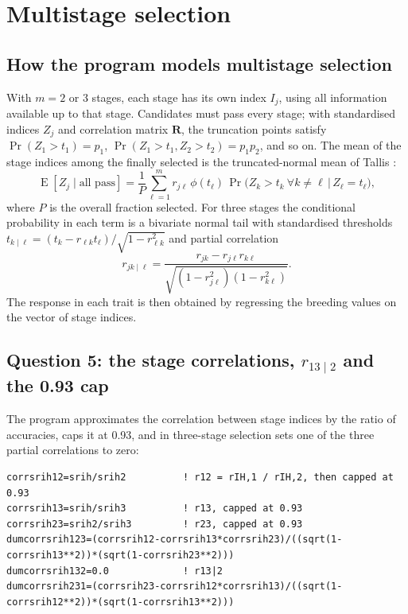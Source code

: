 \documentclass[11pt]{article}
\newcommand{\ma}[1]{\mathbf{#1}}
\newcommand{\E}{\operatorname{E}}
\begin{document}
\section{Multistage selection}\label{sec:multistage}

\subsection{How the program models multistage selection}
With $m=2$ or 3 stages, each stage has its own index $I_j$, using all information available up to that stage. Candidates must pass every stage; with standardised indices $Z_j$ and correlation matrix $\ma R$, the truncation points satisfy $\Pr(Z_1>t_1)=p_1$, $\Pr(Z_1>t_1,Z_2>t_2)=p_1p_2$, and so on. The mean of the stage indices among the finally selected is the truncated-normal mean of Tallis \cite{tallis1961}:
\begin{equation}\label{eq:tallis}
\E[Z_j\mid\text{all pass}]=\frac{1}{P}\sum_{\ell=1}^m r_{j\ell}\,\phi(t_\ell)\,
\Pr\!\big(Z_k>t_k\ \forall k\ne\ell \,\big|\, Z_\ell=t_\ell\big),
\end{equation}
where $P$ is the overall fraction selected. For three stages the conditional probability in each term is a bivariate normal tail with standardised thresholds $t_{k\mid\ell}=(t_k-r_{\ell k}t_\ell)/\sqrt{1-r_{\ell k}^2}$ and partial correlation
\begin{equation}\label{eq:partial}
r_{jk\mid\ell}=\frac{r_{jk}-r_{j\ell}r_{k\ell}}{\sqrt{(1-r_{j\ell}^2)(1-r_{k\ell}^2)}} .
\end{equation}
The response in each trait is then obtained by regressing the breeding values on the vector of stage indices.

\subsection{Question 5: the stage correlations, $r_{13\mid2}$ and the 0.93 cap}
The program approximates the correlation between stage indices by the ratio of accuracies, caps it at 0.93, and in three-stage selection sets one of the three partial correlations to zero:
\begin{lstlisting}
corrsrih12=srih/srih2          ! r12 = rIH,1 / rIH,2, then capped at 0.93
corrsrih13=srih/srih3          ! r13, capped at 0.93
corrsrih23=srih2/srih3         ! r23, capped at 0.93
dumcorrsrih123=(corrsrih12-corrsrih13*corrsrih23)/((sqrt(1-corrsrih13**2))*(sqrt(1-corrsrih23**2)))
dumcorrsrih132=0.0             ! r13|2
dumcorrsrih231=(corrsrih23-corrsrih12*corrsrih13)/((sqrt(1-corrsrih12**2))*(sqrt(1-corrsrih13**2)))
\end{lstlisting}
\end{document}
